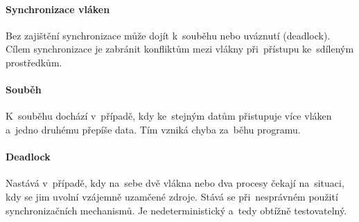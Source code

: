 \paragraph{Synchronizace vláken}

Bez zajištění synchronizace může dojít k~souběhu nebo uváznutí (deadlock). Cílem synchronizace je zabránit konfliktům mezi vlákny při~přístupu ke~sdíleným prostředkům.

\paragraph{Souběh}

K~souběhu dochází v~případě, kdy ke~stejným datům přistupuje více vláken a~jedno druhému přepíše data. Tím vzniká chyba za~běhu programu.

\paragraph{Deadlock}

Nastává v~případě, kdy na~sebe dvě vlákna nebo dva procesy čekají na~situaci, kdy se jim uvolní vzájemně uzamčené zdroje. Stává se při~nesprávném použití synchronizačních mechanismů. Je nedeterministický a~tedy obtížně testovatelný.
